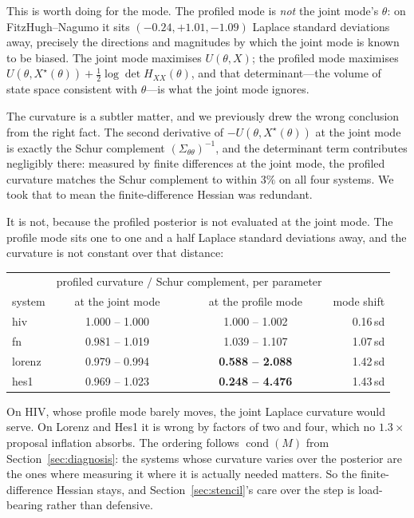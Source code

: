 \documentclass[11pt]{article}
\theoremstyle{plain}
\theoremstyle{definition}
\theoremstyle{remark}
\begin{document}
This is worth doing for the mode. The profiled mode is \emph{not} the joint mode's $\theta$: on
FitzHugh--Nagumo it sits $(-0.24, +1.01, -1.09)$ Laplace standard deviations away, precisely the
directions and magnitudes by which the joint mode is known to be biased. The joint mode maximises
$U(\theta, X)$; the profiled mode maximises $U(\theta, X^\star(\theta)) + \tfrac12\log\det
H_{XX}(\theta)$, and that determinant---the volume of state space consistent with $\theta$---is
what the joint mode ignores.

The curvature is a subtler matter, and we previously drew the wrong conclusion from the right
fact. The second derivative of $-U(\theta, X^\star(\theta))$ at the joint mode is exactly the Schur
complement $(\Sigma_{\theta\theta})^{-1}$, and the determinant term contributes negligibly there:
measured by finite differences at the joint mode, the profiled curvature matches the Schur
complement to within $3\%$ on all four systems. We took that to mean the finite-difference Hessian
was redundant.

It is not, because the profiled posterior is not evaluated at the joint mode. The profile mode sits
one to one and a half Laplace standard deviations away, and the curvature is not constant over that
distance:

\begin{center}\small
\begin{tabular}{lccr}
\toprule
& \multicolumn{2}{c}{profiled curvature $/$ Schur complement, per parameter}\\
system & at the joint mode & at the profile mode & mode shift\\
\midrule
hiv    & 1.000 -- 1.000 & 1.000 -- 1.002 & 0.16\,sd\\
fn     & 0.981 -- 1.019 & 1.039 -- 1.107 & 1.07\,sd\\
lorenz & 0.979 -- 0.994 & \textbf{0.588 -- 2.088} & 1.42\,sd\\
hes1   & 0.969 -- 1.023 & \textbf{0.248 -- 4.476} & 1.43\,sd\\
\bottomrule
\end{tabular}
\end{center}

On HIV, whose profile mode barely moves, the joint Laplace curvature would serve. On Lorenz and
Hes1 it is wrong by factors of two and four, which no $1.3\times$ proposal inflation absorbs. The
ordering follows $\operatorname{cond}(M)$ from Section~\ref{sec:diagnosis}: the systems whose
curvature varies over the posterior are the ones where measuring it where it is actually needed
matters. So the finite-difference Hessian stays, and Section~\ref{sec:stencil}'s care over the step
is load-bearing rather than defensive.
\end{document}
